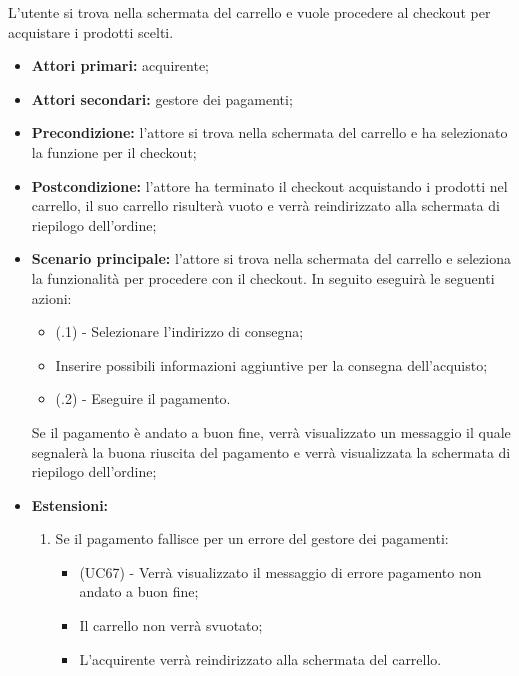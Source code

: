 L'utente si trova nella schermata del carrello e vuole procedere al checkout per acquistare i prodotti scelti.
\begin{itemize}
    \item \textbf{Attori primari:} acquirente;
    \item \textbf{Attori secondari:} gestore dei pagamenti;
    \item \textbf{Precondizione:} l'attore si trova nella schermata del carrello e ha selezionato la funzione per il checkout;
    \item \textbf{Postcondizione:} l'attore ha terminato il checkout acquistando i prodotti nel carrello, il suo carrello risulterà vuoto e verrà reindirizzato alla schermata di riepilogo dell'ordine;
    \item \textbf{Scenario principale:} l'attore si trova nella schermata del carrello e seleziona la funzionalità per procedere con il checkout. In seguito eseguirà le seguenti azioni:
    \begin{itemize}
    	\item (\actualUC.1) - Selezionare l'indirizzo di consegna;
    	\item Inserire possibili informazioni aggiuntive per la consegna dell'acquisto;
        \item (\actualUC.2) - Eseguire il pagamento.
    \end{itemize}
    Se il pagamento è andato a buon fine, verrà visualizzato un messaggio il quale segnalerà la buona riuscita del pagamento e verrà visualizzata la schermata di riepilogo dell'ordine;
    \item \textbf{Estensioni:}
    \begin{enumerate}[label=\lett]
        \item Se il pagamento fallisce per un errore del gestore dei pagamenti:
        \begin{itemize}
            \item (UC67) - Verrà visualizzato il messaggio di errore pagamento non andato a buon fine;
            \item Il carrello non verrà svuotato;
            \item L'acquirente verrà reindirizzato alla schermata del carrello.
        \end{itemize}
    \end{enumerate}
\end{itemize}

